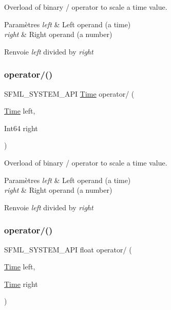 Overload of binary / operator to scale a time value. 


\begin{DoxyParams}{Paramètres}
{\em left} & Left operand (a time) \\
\hline
{\em right} & Right operand (a number)\\
\hline
\end{DoxyParams}
\begin{DoxyReturn}{Renvoie}
{\itshape left} divided by {\itshape right} 
\end{DoxyReturn}
\mbox{\label{classsf_1_1Time_ab72f2de3e2bb592b4b4008dc1ac79056}} 
\subsubsection{\texorpdfstring{operator/()}{operator/()}\hspace{0.1cm}{\footnotesize\ttfamily [2/3]}}
{\footnotesize\ttfamily S\+F\+M\+L\+\_\+\+S\+Y\+S\+T\+E\+M\+\_\+\+A\+PI \hyperlink{classsf_1_1Time}{Time} operator/ (\begin{DoxyParamCaption}\item[{\hyperlink{classsf_1_1Time}{Time}}]{left,  }\item[{Int64}]{right }\end{DoxyParamCaption})\hspace{0.3cm}{\ttfamily [related]}}



Overload of binary / operator to scale a time value. 


\begin{DoxyParams}{Paramètres}
{\em left} & Left operand (a time) \\
\hline
{\em right} & Right operand (a number)\\
\hline
\end{DoxyParams}
\begin{DoxyReturn}{Renvoie}
{\itshape left} divided by {\itshape right} 
\end{DoxyReturn}
\mbox{\label{classsf_1_1Time_ac3ae4f4d24a93e088d8e36d68322ea0f}} 
\subsubsection{\texorpdfstring{operator/()}{operator/()}\hspace{0.1cm}{\footnotesize\ttfamily [3/3]}}
{\footnotesize\ttfamily S\+F\+M\+L\+\_\+\+S\+Y\+S\+T\+E\+M\+\_\+\+A\+PI float operator/ (\begin{DoxyParamCaption}\item[{\hyperlink{classsf_1_1Time}{Time}}]{left,  }\item[{\hyperlink{classsf_1_1Time}{Time}}]{right }\end{DoxyParamCaption})\hspace{0.3cm}{\ttfamily [related]}}



